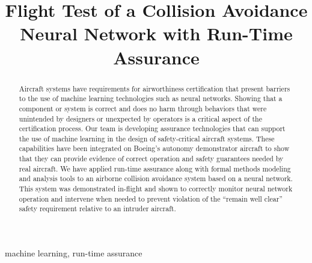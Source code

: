 \documentclass[conference]{IEEEtran}
\begin{document}
\title{Flight Test of a Collision Avoidance Neural Network with Run-Time Assurance
}

\author{
\and
{}
\and
{}
}

\maketitle

\begin{abstract}
Aircraft systems have requirements for airworthiness certification that present barriers to the use
of machine learning technologies such as neural networks. Showing that a component or system is
correct and does no harm through behaviors that were unintended by designers or unexpected by
operators is a critical aspect of the certification process. Our team is developing assurance
technologies that can support the use of machine learning in the design of safety-critical aircraft
systems. These capabilities have been integrated on Boeing’s autonomy demonstrator aircraft to show
that they can provide evidence of correct operation and safety guarantees needed by real aircraft.
We have applied run-time assurance along with formal methods modeling and analysis tools to an
airborne collision avoidance system based on a neural network. This system was demonstrated
in-flight and shown to correctly monitor neural network operation and intervene when needed to
prevent violation of the “remain well clear” safety requirement relative to an intruder aircraft.
\end{abstract}

\begin{IEEEkeywords}
machine learning, run-time assurance
\end{IEEEkeywords}
\end{document}
